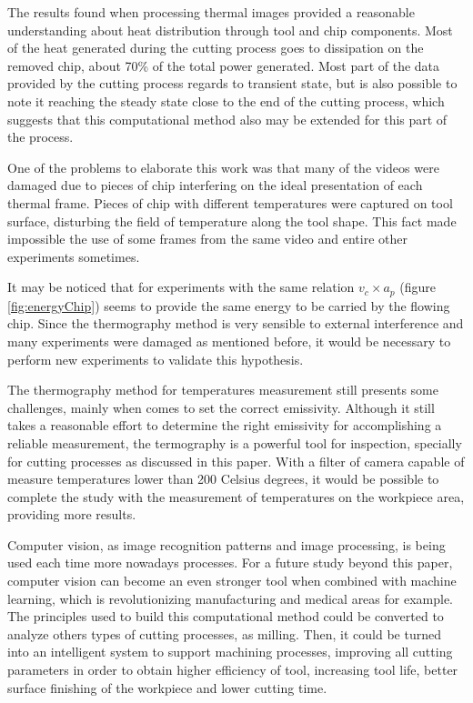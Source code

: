 The results found when processing thermal images provided a reasonable understanding about heat distribution through tool and chip components. Most of the heat generated during the cutting process goes to dissipation on the removed chip, about 70\% of the total power generated. Most part of the data provided by the cutting process regards to transient state, but is also possible to note it reaching the steady state close to the end of the cutting process, which suggests that this computational method also may be extended for this part of the process.

One of the problems to elaborate this work was that many of the videos were damaged due to pieces of chip interfering on the ideal presentation of each thermal frame. Pieces of chip with different temperatures were captured on tool surface, disturbing the field of temperature along the tool shape. This fact made impossible the use of some frames from the same video and entire other experiments sometimes.

It may be noticed that for experiments with the same relation $v_{c}\times a_{p}$ (figure \ref{fig:energyChip}) seems to provide the same energy to be carried by the flowing chip. Since the thermography method is very sensible to external interference and many experiments were damaged as mentioned before, it would be necessary to perform new experiments to validate this hypothesis.

The thermography method for temperatures measurement still presents some challenges, mainly when comes to set the correct emissivity. Although it still takes a reasonable effort to determine the right emissivity for accomplishing a reliable measurement, the termography is a powerful tool for inspection, specially for cutting processes as discussed in this paper. With a filter of camera capable of measure temperatures lower than 200 Celsius degrees, it would be possible to complete the study with the measurement of temperatures on the workpiece area, providing more results.

Computer vision, as image recognition patterns and image processing, is being used each time more nowadays processes. For a future study beyond this paper, computer vision can become an even stronger tool when combined with machine learning, which is revolutionizing manufacturing and medical areas for example. The principles used to build this computational method could be converted to analyze others types of cutting processes, as milling. Then, it could be turned into an intelligent system to support machining processes, improving all cutting parameters in order to obtain higher efficiency of tool, increasing tool life, better surface finishing of the workpiece and lower cutting time.